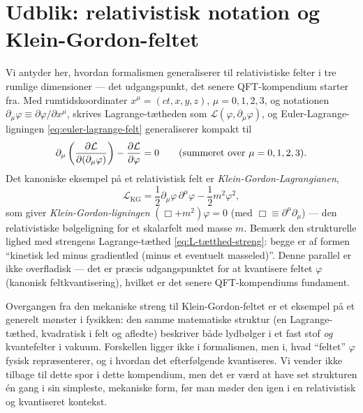 \section{Udblik: relativistisk notation og Klein-Gordon-feltet}
\label{sec:relativistisk-udblik}

Vi antyder her, hvordan formalismen generaliserer til relativistiske
felter i tre rumlige dimensioner — det udgangspunkt, det senere
QFT-kompendium starter fra. Med rumtidskoordinater
$x^\mu=(ct,x,y,z)$, $\mu=0,1,2,3$, og notationen
$\partial_\mu\varphi\equiv\partial\varphi/\partial x^\mu$, skrives
Lagrange-tætheden som $\mathcal{L}(\varphi,\partial_\mu\varphi)$, og
Euler-Lagrange-ligningen \eqref{eq:euler-lagrange-felt} generaliserer
kompakt til
\begin{equation}
  \partial_\mu\left(\pdv{\mathcal{L}}{(\partial_\mu\varphi)}\right) - \pdv{\mathcal{L}}{\varphi} = 0
  \qquad\text{(summeret over } \mu = 0,1,2,3\text{).}
\end{equation}
Det kanoniske eksempel på et relativistisk felt er
\emph{Klein-Gordon-Lagrangianen},
\begin{equation}
  \mathcal{L}_{\text{KG}} = \frac12\partial_\mu\varphi\,\partial^\mu\varphi - \frac12 m^2\varphi^2,
\end{equation}
som giver \emph{Klein-Gordon-ligningen} $(\Box+m^2)\varphi=0$ (med
$\Box\equiv\partial^\mu\partial_\mu$) — den relativistiske
bølgeligning for et skalarfelt med masse $m$. Bemærk den strukturelle
lighed med strengens Lagrange-tæthed \eqref{eq:L-tætthed-streng}: begge
er af formen ``kinetisk led minus gradientled (minus et eventuelt
masseled)''. Denne parallel er ikke overfladisk — det er præcis
udgangspunktet for at kvantisere feltet $\varphi$ (kanonisk
feltkvantisering), hvilket er det senere QFT-kompendiums fundament.

\begin{bemaerkning}
Overgangen fra den mekaniske streng til Klein-Gordon-feltet er et
eksempel på et generelt mønster i fysikken: den samme matematiske
struktur (en Lagrange-tæthed, kvadratisk i felt og afledte)
beskriver både lydbølger i et fast stof \emph{og} kvantefelter i
vakuum. Forskellen ligger ikke i formalismen, men i, hvad ``feltet''
$\varphi$ fysisk repræsenterer, og i hvordan det efterfølgende
kvantiseres. Vi vender ikke tilbage til dette spor i dette kompendium,
men det er værd at have set strukturen én gang i sin simpleste,
mekaniske form, før man møder den igen i en relativistisk og
kvantiseret kontekst.
\end{bemaerkning}

